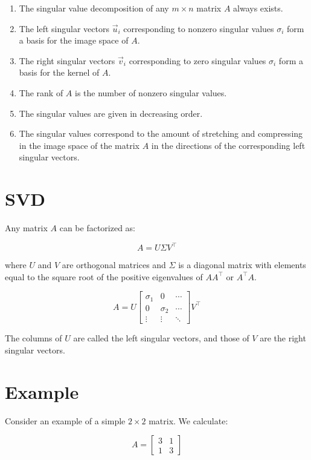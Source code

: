 \documentclass{ximera}
\begin{document}
\begin{problem}
\begin{problem}
\begin{theorem}
  \begin{enumerate}
    \item The singular value decomposition of any $m\times n$ matrix $A$ always exists.
    \item The left singular vectors $\vec{u}_i$ corresponding to nonzero singular values $\sigma_i$ form a basis for the image space of $A$.
    \item The right singular vectors $\vec{v}_i$ corresponding to zero singular values $\sigma_i$ form a basis for the kernel of $A$.
    \item The rank of $A$ is the number of nonzero singular values. 
    \item The singular values are given in decreasing order.
    \item The singular values correspond to the amount of stretching and compressing in the image space of the matrix $A$ in the directions of the corresponding left singular vectors.
  \end{enumerate}

\end{theorem}


\section{SVD}
Any matrix \(A\) can be factorized as:

\[
A = U \Sigma V^\top
\]

where \(U\) and \(V\) are orthogonal matrices and \(\Sigma\) is a diagonal matrix with elements equal to the square root of the positive eigenvalues of \(AA^\top\) or \(A^\top A\).

\[
A = U \begin{bmatrix} \sigma_1 & 0 & \cdots \\ 0 & \sigma_2 & \cdots \\ \vdots & \vdots & \ddots \end{bmatrix} V^\top
\]

The columns of \(U\) are called the left singular vectors, and those of \(V\) are the right singular vectors.

\section{Example}
Consider an example of a simple \(2 \times 2\) matrix. We calculate:

\[
A = \begin{bmatrix} 3 & 1 \\ 1 & 3 \end{bmatrix}
\]


\end{problem}
\end{problem}
\end{document}
